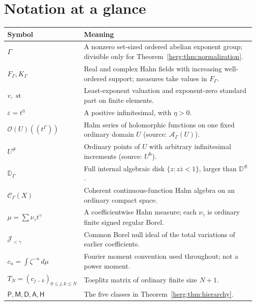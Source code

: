 \documentclass[11pt,letterpaper]{article}
\theoremstyle{definition}
\newcommand{\D}{\mathbb D}\newcommand{\No}{\mathbf{No}}
\newcommand{\FG}{F_\Gamma}\newcommand{\KG}{K_\Gamma}
\newcommand{\OU}[1]{\mathcal O(#1)((t^\Gamma))}
\newcommand{\CH}{\mathscr C_\Gamma}
\newcommand{\st}{\operatorname{st}}
\newcommand{\eps}{\varepsilon}
\newcommand{\dd}{\,d}
\newcommand{\halo}[1]{#1^{\#}}
\numberwithin{equation}{section}
\begin{document}
\section{Notation at a glance}
\label{herg:app:notation}
\begin{center}
\begin{tabularx}{\textwidth}{@{}lX@{}}
\toprule
Symbol & Meaning\\
\midrule
$\Gamma$ & A nonzero set-sized ordered abelian exponent group; divisible only for Theorem~\ref{herg:thm:normalization}.\\
$\FG,\KG$ & Real and complex Hahn fields with increasing well-ordered support; measures take values in $\FG$.\\
$v,\st$ & Least-exponent valuation and exponent-zero standard part on finite elements.\\
$\eps=t^\eta$ & A positive infinitesimal, with $\eta>0$.\\
$\OU{U}$ & Hahn series of holomorphic functions on one fixed ordinary domain $U$ (source: $\mathscr A_\Gamma(U)$).\\
$\halo U$ & Ordinary points of $U$ with arbitrary infinitesimal increments (source: $U^{\mathrm h}$).\\
$\D_\Gamma$ & Full internal algebraic disk $\{z:z\bar z<1\}$, larger than $\halo\D$.\\
$\CH(X)$ & Coherent continuous-function Hahn algebra on an ordinary compact space.\\
$\mu=\sum\nu_\gamma t^\gamma$ & A coefficientwise Hahn measure; each $\nu_\gamma$ is ordinary finite signed regular Borel.\\
$\mathcal J_{<\gamma}$ & Common Borel null ideal of the total variations of earlier coefficients.\\
$c_n=\int\zeta^{-n}\dd\mu$ & Fourier moment convention used throughout; not a power moment.\\
$T_N=(c_{j-k})_{0\le j,k\le N}$ & Toeplitz matrix of ordinary finite size $N+1$.\\
$\mathsf P,\mathsf M,\mathsf D,\mathsf A,\mathsf H$ & The five classes in Theorem~\ref{herg:thm:hierarchy}.\\
\bottomrule
\end{tabularx}
\end{center}
\end{document}
